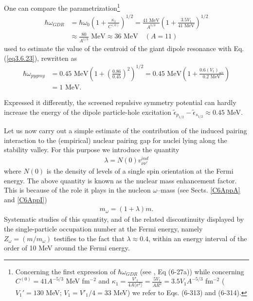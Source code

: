 One can compare the parametrization\footnote{Concerning the first expression of $\hbar\omega_{GDR}$ (see \cite{Bohr:75}, Eq (6-27a)) while concerning $C^{(0)}=41A^{-5/3}$ MeV fm$^{-2}$ and $\kappa_1=\frac{V'_1}{4A\langle x^2\rangle}=\frac{5V_1}{AR^2}=3.5V_1A^{-5/3}$ fm$^{-2}$ ($V_1'=130$ MeV; $V_1=V'_1/4=33$ MeV) we refer to Eqs. (6-313) and (6-314).}
\begin{align}\label{eq4.8.21}
\nonumber\hbar\omega_{GDR}&=\hbar\omega_0\left(1+\frac{\kappa_1}{C^{(0)}}\right)^{1/2}=\frac{41\text{ MeV}}{A^{1/3}}\left(1+\frac{3.5 V_1}{41\text{ MeV}}\right)^{1/2}\\
&\approx\frac{80}{A^{1/3}}\text{ MeV}\approx36\text{ MeV}\quad(A=11)
\end{align}
used to estimate the value of the centroid of the giant dipole resonance with Eq. (\ref{eq3.6.23}), rewritten as
\begin{align}\label{eq4.8.22}
\nonumber\hbar\omega_{pygmy}&=0.45\text{ MeV}\left(1+\left(\frac{0.86}{0.45}\right)^2\right)^{1/2}=0.45\text{ MeV}\left(1+\frac{0.6(V_1)_{scr}}{0.2\text{ MeV}}\right)\\
&=1\text{ MeV}.
\end{align}



Expressed it differently, the screened repulsive symmetry potential can hardly increase the energy of the dipole particle-hole excitation $\tilde\epsilon_{p_{1/2}}-\tilde\epsilon_{s_{1/2}}\approx0.45$ MeV.

Let us now carry out a simple estimate of the contribution of the induced pairing interaction to the (empirical) nuclear pairing gap for nuclei lying along the stability valley. For this purpose we introduce the quantity
 \begin{align}
\lambda=N(0)v_{\nu\nu'}^{ind}
 \end{align}
where $N(0)$ is the density of levels of a single spin orientation at the Fermi energy. The above quantity is known as the nuclear mass enhancement factor. This is because of the role it plays in the nucleon $\omega$--mass (see Sects. \ref{C6AppA} and \ref{C6AppI})
 \begin{align}
m_\omega=(1+\lambda)m.
 \end{align}
Systematic studies of this quantity, and of the related discontinuity displayed by the single-particle occupation number at the Fermi energy, namely $Z_\omega=(m/m_\omega)$ testifies to the fact that $\lambda\approx0.4$, within an energy interval of the order of 10 MeV around the Fermi energy.


